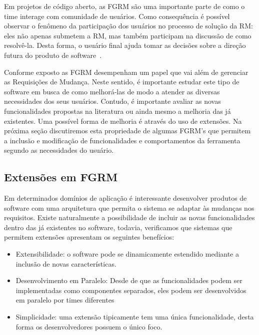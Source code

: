 Em projetos de código aberto, as FGRM são uma importante parte de como o time
interage com comunidade de usuários. Como consequência é possível observar o
fenômeno da participação dos usuários no processo de solução da RM: eles não
apenas submetem a RM, mas também participam na discussão de como resolvê-la.
Desta forma, o usuário final ajuda tomar as decisões sobre a direção futura do
produto de software~\cite{breu2010information}.

Conforme exposto as FGRM desempenham um papel que vai além de gerenciar as
Requisições de Mudança.  Neste sentido, é importante estudar este tipo de
software em busca de como melhorá-las de modo a atender as diversas necessidades
dos seus usuários. Contudo, é importante avaliar as novas funcionalidades
propostas na literatura ou ainda mesmo a melhoria das já existentes. Uma
possível forma de melhoria é através do uso de extensões. Na próxima seção
discutiremos esta propriedade de algumas FGRM's que permitem a inclusão e
modificação de funcionalidades e comportamentos da ferramenta segundo as
necessidades do usuário.

\subsection{Extensões em FGRM} \label{subsec:extensoes_fgrm}

Em determinados domínios de aplicação é interessante desenvolver produtos de
software com uma arquitetura que permita o sistema se adaptar às mudanças nos
requisitos. Existe naturalmente a possibilidade de incluir as novas
funcionalidades dentro das já existentes no software, todavia, verificamos que
sistemas que permitem extensões apresentam os seguintes benefícios:

\begin{itemize} \item Extensibilidade: o software pode se dinamicamente
		estendido mediante a inclusão de novas características.  \item
		Desenvolvimento em Paralelo: Desde de que as funcionalidades podem ser
		implementadas como componentes separados, eles podem ser desenvolvidos
		em paralelo por times diferentes \item Simplicidade: uma  extensão
		tipicamente tem uma única funcionalidade, desta forma os desenvolvedores
		possuem o único foco.  \end{itemize}

